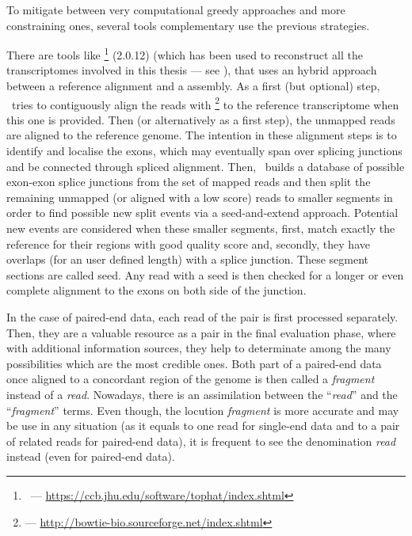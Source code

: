 To mitigate between very computational greedy approaches and more constraining
ones, several tools complementary use the previous strategies.

There are tools like \toph\footnote{\toph\ ---
\href{https://ccb.jhu.edu/software/tophat/index.shtml}
{https://ccb.jhu.edu/software/tophat/index.shtml}} (2.0.12) 
(which has been used to reconstruct all the
transcriptomes involved in this thesis --- see ),
that uses an hybrid approach between a reference alignment and a 
assembly. As a first (but optional) step, \toph\ tries to contiguously
align the reads with \footnote{ ---
\href{http://bowtie-bio.sourceforge.net/index.shtml}%
{http://bowtie-bio.sourceforge.net/index.shtml}} 
to the reference transcriptome when this one is provided. Then
(or alternatively as a first step), the unmapped reads are aligned to the
reference genome. The intention in these alignment steps is to identify and
localise the exons, which may eventually span over splicing junctions and be
connected through spliced alignment. Then, \toph\ builds a database of
possible exon-exon splice junctions from the set of mapped reads and then split
the remaining unmapped (or aligned with a low score) reads to smaller segments
in order to find
possible new split events via a seed-and-extend approach. Potential new events
are considered when these smaller segments, first, match exactly the reference
for their regions with good quality score and, secondly, they have overlaps
(for an user defined length) with a splice junction. These segment sections are
called seed. Any read with a seed is then checked for a longer or even complete
alignment to the exons on both side of the junction.

In the case of paired-end data, each read of the pair is first processed
separately. Then, they are a valuable resource as a pair in the final evaluation
phase, where with additional
information sources, they help to determinate among the many possibilities which
are the most credible ones. Both part of a paired-end data once aligned to a
concordant region of the genome is then called a \emph{fragment} instead of a
\emph{read}. Nowadays, there is an assimilation between the \enquote{\emph{read}}
and the \enquote{\emph{fragment}} terms. Even though, the locution \emph{fragment}
is more accurate and may be use in any situation (as it equals to one read for
single-end data and to a pair of related reads for paired-end data), it is
frequent to see the denomination \emph{read} instead (even for paired-end data).

